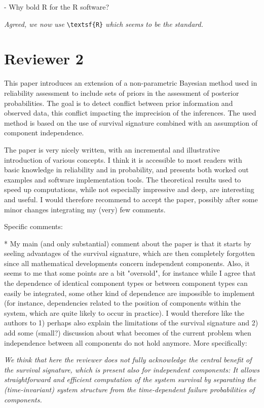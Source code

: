 \documentclass[12pt, a4paper]{elsarticle}
\begin{document}
- Why bold R for the R software?

\medskip
\emph{Agreed, we now use} \verb+\textsf{R}+ \emph{which seems to be the standard.}
\medskip


\section*{Reviewer 2}

This paper introduces an extension of a non-parametric Bayesian method used in reliability assessment to include sets of priors in the assessment of posterior probabilities. The goal is to detect conflict between prior information and observed data, this conflict impacting the imprecision of the inferences. The used method is based on the use of survival signature combined with an assumption of component independence.

The paper is very nicely written, with an incremental and illustrative introduction of various concepts. I think it is accessible to most readers with basic knowledge in reliability and in probability, and presents both worked out examples and software implementation tools. The theoretical results used to speed up computations, while not especially impressive and deep, are interesting and useful. I would therefore recommend to accept the paper, possibly after some minor changes integrating my (very) few comments.

Specific comments:

* My main (and only substantial) comment about the paper is that it starts by seeling advantages of the survival signature, which are then completely forgotten since all mathematical developments concern independent components. Also, it seems to me that some points are a bit "oversold", for instance while I agree that the dependence of identical component types or between component types can easily be integrated, some other kind of dependence are impossible to implement (for instance, dependencies related to the position of components within the system, which are quite likely to occur in practice). I would therefore like the authors to 1) perhaps also explain the limitations of the survival signature and 2) add some (small?) discussion about what becomes of the current problem when independence between all components do not hold anymore. More specifically:

\medskip
\emph{We think that here the reviewer does not fully acknowledge the central benefit of the survival signature,
which is present also for independent components:
It allows straightforward and efficient computation of the system survival by separating the (time-invariant) system structure from the time-dependent failure probabilities of components.}
\medskip
\end{document}
